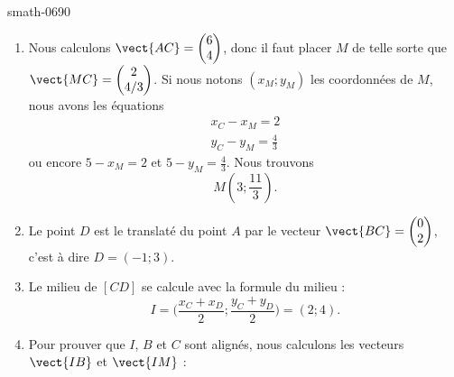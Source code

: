 
\begin{corrige}{smath-0690}

    \begin{enumerate}
        \item
            Nous calculons \( \vect{ AC }=\begin{pmatrix}
                6    \\ 
                4    
            \end{pmatrix}\), donc il faut placer \( M\) de telle sorte que \( \vect{ MC }=\begin{pmatrix}
                2    \\ 
                4/3    
            \end{pmatrix}\).
            Si nous notons \( (x_M;y_M)\) les coordonnées de \( M\), nous avons les équations
            \begin{subequations}
                \begin{align}
                    x_C-x_M=2\\
                    y_C-y_M=\frac{ 4 }{ 3 }
                \end{align}
            \end{subequations}
            ou encore \( 5-x_M=2\) et \( 5-y_M=\frac{ 4 }{ 3 }\). Nous trouvons
            \begin{equation}
                M(3;\frac{ 11 }{ 3 }).
            \end{equation}
        \item
            Le point \( D\) est le translaté du point \( A\) par le vecteur \( \vect{ BC }=\begin{pmatrix}
                0    \\ 
                2    
            \end{pmatrix}\), c'est à dire \( D=(-1;3)\).
        \item
            Le milieu de \( [CD]\) se calcule avec la formule du milieu :
            \begin{equation}
                I=\big( \frac{ x_C+x_D }{2};\frac{ y_C+y_D }{2} \big)=(2;4).
            \end{equation}
        \item
            Pour prouver que \( I\), \( B\) et \( C\) sont alignés, nous calculons les vecteurs \( \vect{ IB }\) et \( \vect{ IM }\) :

\end{enumerate}
\end{corrige}
